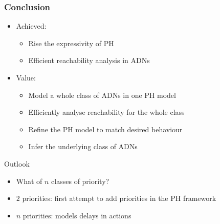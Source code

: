 \begin{frame}[c]
  \frametitle{Conclusion}


\begin{itemize}
  \item Achieved:
  \begin{itemize}
    \item Rise the expressivity of PH
    \item Efficient reachability analysis in ADNs
  \end{itemize}
  
  \smallskip
  \item Value:
  \begin{itemize}
    \item Model a whole class of ADNs in one PH model
    \item Efficiently analyse reachability for the whole class
    \item Refine the PH model to match desired behaviour
    \item Infer the underlying class of ADNs\\\tcite{\citefpimrcmsb}
  \end{itemize}
\end{itemize}



\pause
\bigskip
\begin{flushright}
\Large
\textcolor{couleurtheme}{Outlook}\hspace*{2.7em}
\end{flushright}

\begin{itemize}
  \item What of $n$ classes of priority?
  \item $2$ priorities: first attempt to add priorities in the PH framework
  \item $n$ priorities: models delays in actions
\end{itemize}
\end{frame}



